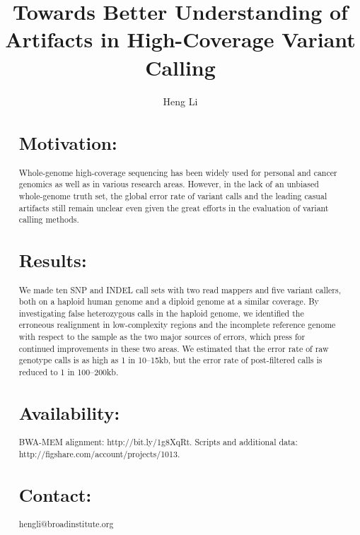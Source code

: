 \documentclass{bioinfo}
\begin{document}

\title{Towards Better Understanding of Artifacts in High-Coverage Variant Calling}
\author[Li]{Heng Li}

\address{Broad Institute of Harvard and MIT, 7 Cambridge Center, Cambridge, MA 02142, USA}

\maketitle

\begin{abstract}

\section{Motivation:} Whole-genome high-coverage sequencing has been widely
used for personal and cancer genomics as well as in various research areas.
However, in the lack of an unbiased whole-genome truth set, the global error
rate of variant calls and the leading casual artifacts still remain unclear
even given the great efforts in the evaluation of variant calling methods.

\section{Results:} We made ten SNP and INDEL call sets with two read mappers
and five variant callers, both on a haploid human genome and a diploid genome
at a similar coverage. By investigating false heterozygous calls in the haploid
genome, we identified the erroneous realignment in low-complexity regions and
the incomplete reference genome with respect to the sample as the two major
sources of errors, which press for continued improvements in these two areas.
We estimated that the error rate of raw genotype calls is as high as 1 in
10--15kb, but the error rate of post-filtered calls is reduced to 1 in
100--200kb.

\section{Availability:} BWA-MEM alignment: http://bit.ly/1g8XqRt. Scripts and
additional data: http://figshare.com/account/projects/1013.

\section{Contact:} hengli@broadinstitute.org

\end{abstract}
\end{document}
